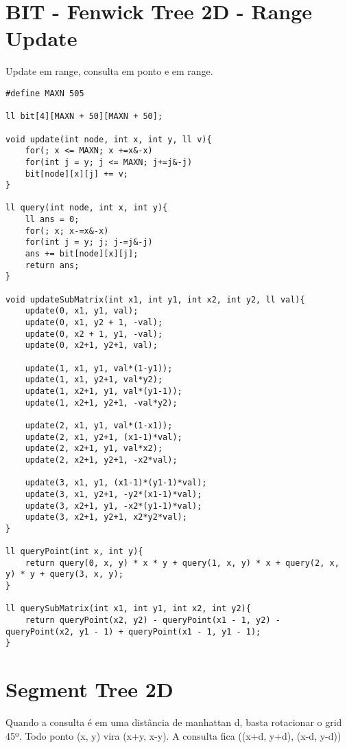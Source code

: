 \section{BIT - Fenwick Tree 2D - Range Update}

Update em range, consulta em ponto e em range.
\begin{multicols}{2}
	\begin{lstlisting}
#define MAXN 505

ll bit[4][MAXN + 50][MAXN + 50];

void update(int node, int x, int y, ll v){
	for(; x <= MAXN; x +=x&-x)
	for(int j = y; j <= MAXN; j+=j&-j)
	bit[node][x][j] += v;
}

ll query(int node, int x, int y){
	ll ans = 0;
	for(; x; x-=x&-x)
	for(int j = y; j; j-=j&-j)
	ans += bit[node][x][j];
	return ans;
}

void updateSubMatrix(int x1, int y1, int x2, int y2, ll val){
	update(0, x1, y1, val);
	update(0, x1, y2 + 1, -val);
	update(0, x2 + 1, y1, -val);	
	update(0, x2+1, y2+1, val);
	
	update(1, x1, y1, val*(1-y1));
	update(1, x1, y2+1, val*y2);
	update(1, x2+1, y1, val*(y1-1));
	update(1, x2+1, y2+1, -val*y2);
	
	update(2, x1, y1, val*(1-x1));
	update(2, x1, y2+1, (x1-1)*val);
	update(2, x2+1, y1, val*x2);
	update(2, x2+1, y2+1, -x2*val);
	
	update(3, x1, y1, (x1-1)*(y1-1)*val);
	update(3, x1, y2+1, -y2*(x1-1)*val);
	update(3, x2+1, y1, -x2*(y1-1)*val);
	update(3, x2+1, y2+1, x2*y2*val);
}

ll queryPoint(int x, int y){
	return query(0, x, y) * x * y + query(1, x, y) * x + query(2, x, y) * y + query(3, x, y);
}

ll querySubMatrix(int x1, int y1, int x2, int y2){
	return queryPoint(x2, y2) - queryPoint(x1 - 1, y2) - queryPoint(x2, y1 - 1) + queryPoint(x1 - 1, y1 - 1);
}

\end{lstlisting}
\end{multicols}

\section{Segment Tree 2D}

Quando a consulta é em uma distância de manhattan d, basta rotacionar o grid 45º.
Todo ponto (x, y) vira (x+y, x-y).
A consulta fica ((x+d, y+d), (x-d, y-d))

